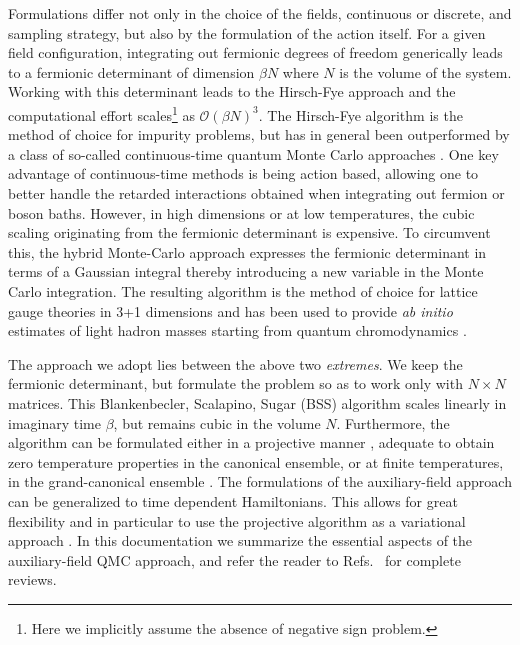Formulations differ not only in the choice of the fields, continuous or discrete, and sampling strategy, but also by the formulation of the action itself.
For a given field configuration, integrating out fermionic degrees of freedom generically leads to a fermionic determinant of dimension $\beta N$ where $N$ is the volume of the system.  Working  with this determinant leads to the  Hirsch-Fye approach \cite{HirschFye86}  and the computational effort scales\footnote{Here we implicitly assume the absence of negative sign problem.} as $\mathcal{O}\left( \beta N \right)^3$. The Hirsch-Fye  algorithm is the method of choice for impurity problems, but has  in general been outperformed by a class of so-called continuous-time quantum Monte Carlo approaches  
\cite{Gull_rev,Assaad14_rev, Assaad07}.  One key advantage of continuous-time methods is being action based, allowing one to better handle the retarded interactions obtained when integrating out fermion or boson baths. However, in high dimensions or at low temperatures, the cubic scaling originating from the fermionic determinant is expensive. To circumvent this, the hybrid Monte-Carlo approach  \cite{Scalettar86,Duane87,Beyl17}  expresses the fermionic determinant in terms of a Gaussian integral thereby introducing a new variable in the Monte Carlo integration.    The resulting algorithm is the method of choice for lattice gauge theories in 3+1 dimensions   and has been used to provide \emph{ab initio} estimates of light hadron masses starting from quantum chromodynamics \cite{Durr08}.

The approach we adopt lies between the above two \emph{extremes}.  We keep the fermionic determinant, but formulate  the problem so as to  work only with $N\times N$ matrices.    This 
Blankenbecler,  Scalapino, Sugar (BSS)  algorithm scales linearly in  imaginary time $\beta$, but remains cubic in the volume $N$.    Furthermore, the algorithm can be formulated either in a projective manner \cite{Sugiyama86,Sorella89},  adequate to obtain zero temperature properties in the  canonical ensemble,  or at finite temperatures, in the  grand-canonical ensemble \cite{White89}.   
The formulations of  the auxiliary-field approach  can  be  generalized  to   time  dependent   Hamiltonians.   This  
allows    for  great  flexibility  and in particular  to  use  the  projective  algorithm  as  a  variational approach   \cite{Sorella21}. 
In this documentation we summarize the essential aspects of the auxiliary-field QMC approach, and refer the reader to Refs.~\cite{Assaad02,Assaad08_rev} for complete reviews. 



